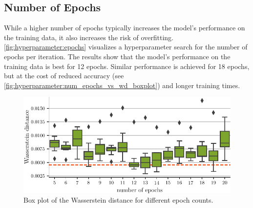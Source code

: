 \subsection{Number of Epochs}
While a higher number of epochs typically increases the model's performance on the training data,
it also increases the risk of overfitting.
%
\autoref{fig:hyperparameter:epochs} visualizes a hyperparameter search for the number of epochs per \dsea{} iteration.
The results show that the model's performance on the training data is best for \num{12} epochs.
Similar performance is achieved for \num{18} epochs,
  but at the cost of
    reduced accuracy
      (see \autoref{fig:hyperparameter:num_epochs_vs_wd_boxplot})
    and longer training times.

\begin{figure}
  \centering
  \includegraphics[width=\textwidth]{content/plots/hyperparam/num_epochs_vs_wd_boxplot_lessheight.pdf}
  \caption{Box plot of the Wasserstein distance for different epoch counts.}
  \label{fig:hyperparameter:epochs}
\end{figure}
